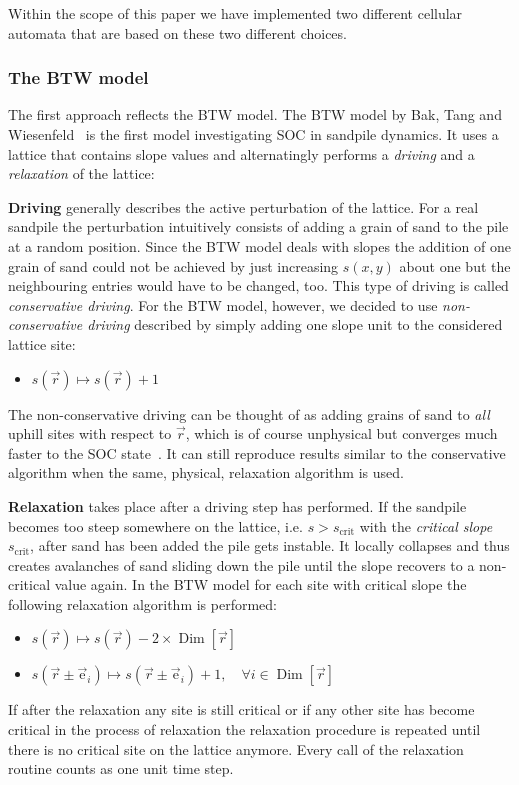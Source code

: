 Within the scope of this paper we have implemented two different cellular automata that are based on these two different
choices.

\subsubsection{The BTW model}
The first approach reflects the BTW model. The BTW model by Bak, Tang and Wiesenfeld~\cite{BakTangWiesenfeld:1987}
is the first model investigating SOC in sandpile dynamics. It uses a lattice that contains slope values and
alternatingly performs a \emph{driving} and a \emph{relaxation} of the lattice:

\textbf{Driving} generally describes the active perturbation of the lattice. For a real sandpile the perturbation
intuitively consists of adding a grain of sand to the pile at a random position. Since the BTW model deals with slopes
the addition of one grain of sand could not be achieved by just increasing $s(x,y)$ about one but the neighbouring
entries would have to be changed, too. This type of driving is called \emph{conservative driving}.
For the BTW model, however, we decided to use \emph{non-conservative driving} described by simply adding one slope
unit to the considered lattice site:
\begin{itemize}
\item $s(\vec{r}) \mapsto s(\vec{r})+1$
\end{itemize}
The non-conservative driving can be thought of as adding grains of sand to \emph{all} uphill sites with respect to
$\vec{r}$, which is of course unphysical but converges much faster to the SOC state~\cite{Christensen1991}. It can
still reproduce results similar to the conservative algorithm when the same, physical, relaxation algorithm is used.

\textbf{Relaxation} takes place after a driving step has performed. If the sandpile becomes too steep somewhere on the
lattice, i.e. $s > s_{\mathrm{crit}}$ with the \emph{critical slope} $s_{\mathrm{crit}}$, after sand has been added
the pile gets instable. It locally collapses and thus creates avalanches of sand sliding down the pile until the slope
recovers to a non-critical value again. In the BTW model for each site with critical slope the following relaxation
algorithm is performed:
\begin{itemize}
\item $s(\vec{r}) \mapsto s(\vec{r}) - 2\times\operatorname{Dim}\left[\vec{r}\right]$
\item $s(\vec{r}\pm\vec{\mathrm{e}}_i) \mapsto s(\vec{r}\pm\vec{\mathrm{e}}_i) + 1,
\quad \forall i\in\operatorname{Dim}\left[\vec{r}\right]$
\end{itemize}
If after the relaxation any site is still critical or if any other site has become critical in the process of relaxation
the relaxation procedure is repeated until there is no critical site on the lattice anymore. Every call of the relaxation
routine counts as one unit time step.

